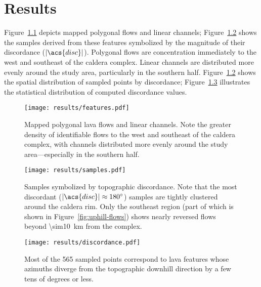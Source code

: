 \chapter{Results}\label{cha:results}

Figure~\ref{fig:features} depicts mapped polygonal flows and linear channels; Figure~\ref{fig:samples} shows the samples derived from these features symbolized by the magnitude of their discordance ($|\acs{disc}|$). Polygonal flows are concentration immediately to the west and southeast of the caldera complex. Linear channels are distributed more evenly around the study area, particularly in the southern half. Figure~\ref{fig:samples} shows the spatial distribution of sampled points by discordance; Figure~\ref{fig:discordance} illustrates the statistical distribution of computed discordance values. 

\begin{figure}
    \texttt{[image: results/features.pdf]}%
    \caption[Mapped lava features]{Mapped polygonal lava flows and linear channels. Note the greater density of identifiable flows to the west and southeast of the caldera complex, with channels distributed more evenly around the study area---especially in the southern half.}%
    \label{fig:features}
\end{figure}

\begin{figure}
    \texttt{[image: results/samples.pdf]}%
    \caption[Spatial distribution of discordance]{Samples symbolized by topographic discordance. Note that the most discordant ($|\acs{disc}|\approx\ang{180}$) samples are tightly clustered around the caldera rim. Only the southeast region (part of which is shown in Figure~\ref{fig:uphill-flows}) shows nearly reversed flows beyond \qty{\sim10}{\km} from the complex.}%
    \label{fig:samples}
\end{figure}

\begin{figure}
    \texttt{[image: results/discordance.pdf]}%
    \caption[Statistical distribution of discordance]{Most of the 565 sampled points correspond to lava features whose azimuths diverge from the topographic downhill direction by a few tens of degrees or less.}%
    \label{fig:discordance}
\end{figure}

